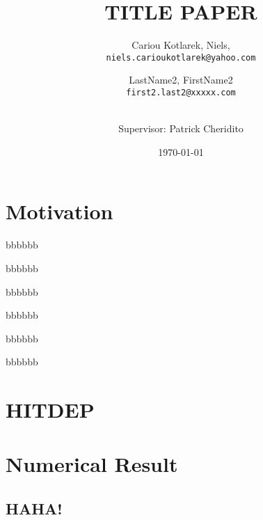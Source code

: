 \documentclass[10pt]{article}
\title{TITLE PAPER}
\author{
    Cariou Kotlarek, Niels,\\
    \texttt{niels.carioukotlarek@yahoo.com}
    \and
    LastName2, FirstName2\\
    \texttt{first2.last2@xxxxx.com}
    \and
    \\ Supervisor: Patrick Cheridito
}
\date{\today}
\begin{document}
\maketitle
    \begin{abstract}
    \end{abstract}
    


    \section{Motivation}
    \lipsum
    \begin{theorem}
    \end{theorem}

    \begin{corollary}
    \end{corollary}

    \begin{proposition}
        bbbbbb
    \end{proposition}

    \begin{conjecture}
        bbbbbb
    \end{conjecture}

    \begin{lemma}
        bbbbbb
    \end{lemma}

    \begin{definition}
        bbbbbb
    \end{definition}

    \begin{remark}
        bbbbbb
    \end{remark}

    \begin{assumption}
        bbbbbb
    \end{assumption}


    \section{HITDEP}
    \lipsum


    \section{Numerical Result}

    \subsection{HAHA!}
    \lipsum


    \printbibliography[category=cited]%
    \printbibliography[title={Further Reading},notcategory=cited]
    \nocite{*}
\end{document}
